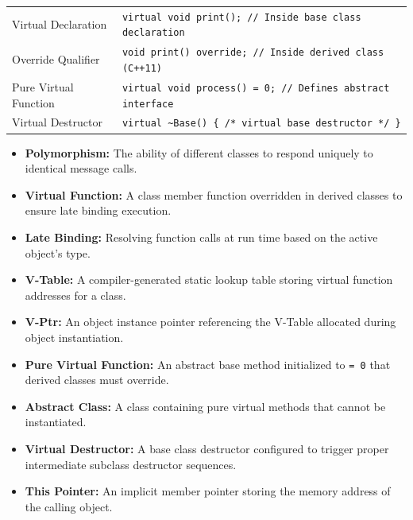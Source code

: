 \documentclass[12pt,a4paper]{article}
\renewcommand{\arraystretch}{1.45}
\begin{document}
\begin{tcolorbox}[formulabox, title={\textbf{Key Polymorphic Syntax}}]
\renewcommand{\arraystretch}{1.3}
\begin{tabularx}{\linewidth}{B{3.8cm} X}
Virtual Declaration      & \texttt{virtual void print(); // Inside base class declaration} \\[4pt]
Override Qualifier       & \texttt{void print() override; // Inside derived class (C++11)} \\[4pt]
Pure Virtual Function    & \texttt{virtual void process() = 0; // Defines abstract interface} \\[4pt]
Virtual Destructor       & \texttt{virtual \textasciitilde Base() \{ /* virtual base destructor */ \}}
\end{tabularx}
\end{tcolorbox}

\begin{tcolorbox}[defbox, title={\textbf{One-Line Definitions}}]
\begin{itemize}[leftmargin=*, itemsep=2.5pt, topsep=0pt]
  \item \textbf{Polymorphism:} The ability of different classes to respond uniquely to identical message calls.
  \item \textbf{Virtual Function:} A class member function overridden in derived classes to ensure late binding execution.
  \item \textbf{Late Binding:} Resolving function calls at run time based on the active object's type.
  \item \textbf{V-Table:} A compiler-generated static lookup table storing virtual function addresses for a class.
  \item \textbf{V-Ptr:} An object instance pointer referencing the V-Table allocated during object instantiation.
  \item \textbf{Pure Virtual Function:} An abstract base method initialized to \texttt{= 0} that derived classes must override.
  \item \textbf{Abstract Class:} A class containing pure virtual methods that cannot be instantiated.
  \item \textbf{Virtual Destructor:} A base class destructor configured to trigger proper intermediate subclass destructor sequences.
  \item \textbf{This Pointer:} An implicit member pointer storing the memory address of the calling object.
\end{itemize}
\end{tcolorbox}
\end{document}
